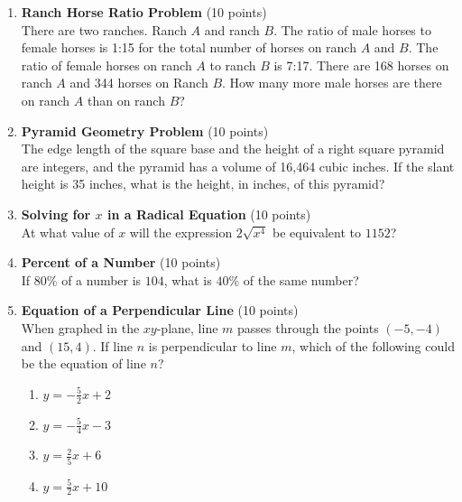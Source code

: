 \begin{enumerate}
  \item \textbf{Ranch Horse Ratio Problem} (10 points)\\
  There are two ranches. Ranch $A$ and ranch $B$. The ratio of male horses to female horses is 1:15 for the total number of horses on ranch $A$ and $B$. The ratio of female horses on ranch $A$ to ranch $B$ is 7:17. There are 168 horses on ranch $A$ and 344 horses on Ranch $B$. How many more male horses are there on ranch $A$ than on ranch $B$?
  \begin{subanswer}
  \end{subanswer}

  \newpage

  \item \textbf{Pyramid Geometry Problem} (10 points)\\
  The edge length of the square base and the height of a right square pyramid are integers, and the pyramid has a volume of 16,464 cubic inches. If the slant height is 35 inches, what is the height, in inches, of this pyramid?
  \begin{subanswer}
  \end{subanswer}

  \newpage

  \item \textbf{Solving for $x$ in a Radical Equation} (10 points)\\
  At what value of $x$ will the expression $2\sqrt{x^4}$ be equivalent to $1152$?
  \begin{subanswer}
  \end{subanswer}

  \item \textbf{Percent of a Number} (10 points)\\
  If $80\%$ of a number is $104$, what is $40\%$ of the same number?
  \begin{subanswer}
  \end{subanswer}

  \item \textbf{Equation of a Perpendicular Line} (10 points)\\
  When graphed in the $xy$-plane, line $m$ passes through the points $(-5, -4)$ and $(15, 4)$. If line $n$ is perpendicular to line $m$, which of the following could be the equation of line $n$?
  \begin{enumerate}[label=(\Alph*)]
    \item $y = -\frac{5}{2}x + 2$
    \item $y = -\frac{5}{4}x - 3$
    \item $y = \frac{2}{5}x + 6$
    \item $y = \frac{5}{2}x + 10$
  \end{enumerate}
  \begin{subanswer}
  \end{subanswer}




\end{enumerate}
